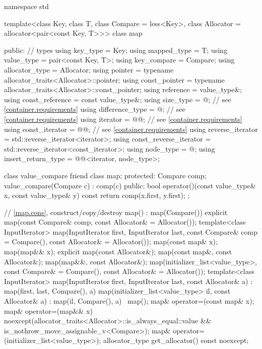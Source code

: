 %
%
\begin{codeblock}
namespace std {
  template<class Key, class T, class Compare = less<Key>,
           class Allocator = allocator<pair<const Key, T>>>
  class map {
  public:
    // types
    using key_type               = Key;
    using mapped_type            = T;
    using value_type             = pair<const Key, T>;
    using key_compare            = Compare;
    using allocator_type         = Allocator;
    using pointer                = typename allocator_traits<Allocator>::pointer;
    using const_pointer          = typename allocator_traits<Allocator>::const_pointer;
    using reference              = value_type&;
    using const_reference        = const value_type&;
    using size_type              = @\impdef@; // see \ref{container.requirements}
    using difference_type        = @\impdef@; // see \ref{container.requirements}
    using iterator               = @@; // see \ref{container.requirements}
    using const_iterator         = @@; // see \ref{container.requirements}
    using reverse_iterator       = std::reverse_iterator<iterator>;
    using const_reverse_iterator = std::reverse_iterator<const_iterator>;
    using node_type              = @\unspec@;
    using insert_return_type     = @@<iterator, node_type>;

    class value_compare {
      friend class map;
    protected:
      Compare comp;
      value_compare(Compare c) : comp(c) {}
    public:
      bool operator()(const value_type& x, const value_type& y) const {
        return comp(x.first, y.first);
      }
    };

    // \ref{map.cons}, construct/copy/destroy
    map() : map(Compare()) { }
    explicit map(const Compare& comp, const Allocator& = Allocator());
    template<class InputIterator>
      map(InputIterator first, InputIterator last,
          const Compare& comp = Compare(), const Allocator& = Allocator());
    map(const map& x);
    map(map&& x);
    explicit map(const Allocator&);
    map(const map&, const Allocator&);
    map(map&&, const Allocator&);
    map(initializer_list<value_type>,
      const Compare& = Compare(),
      const Allocator& = Allocator());
    template<class InputIterator>
      map(InputIterator first, InputIterator last, const Allocator& a)
        : map(first, last, Compare(), a) { }
    map(initializer_list<value_type> il, const Allocator& a)
      : map(il, Compare(), a) { }
    ~map();
    map& operator=(const map& x);
    map& operator=(map&& x)
      noexcept(allocator_traits<Allocator>::is_always_equal::value &&
               is_nothrow_move_assignable_v<Compare>);
    map& operator=(initializer_list<value_type>);
    allocator_type get_allocator() const noexcept;

}}
\end{codeblock}
